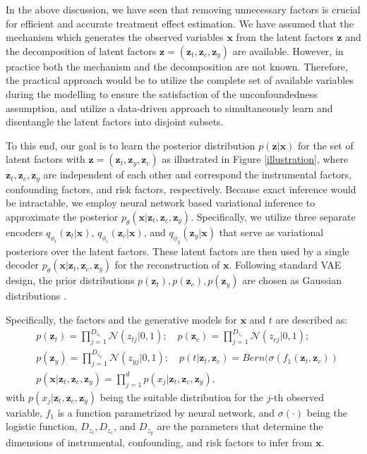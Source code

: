 \documentclass[letterpaper]{article} %
\begin{document}
In the above discussion, we have seen that removing unnecessary factors is crucial for efficient and accurate treatment effect estimation. We have assumed that the mechanism which generates the observed variables $\mathbf{x}$ from the latent factors $\mathbf{z}$ and the decomposition of latent factors $\mathbf{z} = (\mathbf{z}_t, \mathbf{z}_c, \mathbf{z}_y)$ are available.
However, in practice both the mechanism and the decomposition are not known. Therefore, the practical approach would be to utilize the complete set of available variables during the modelling to ensure the satisfaction of the unconfoundedness assumption, and utilize a data-driven approach to simultaneously learn and disentangle the latent factors into disjoint subsets.

To this end, our goal is to learn the posterior distribution $p(\mathbf{z}|\mathbf{x})$ for the set of latent factors  with $\mathbf{z}= (\mathbf{z}_t, \mathbf{z}_y, \mathbf{z}_c)$ as illustrated in Figure \ref{illustration}, where $\mathbf{z}_t,\mathbf{z}_c, \mathbf{z}_y$ are independent of each other and correspond the instrumental factors, confounding factors, and risk factors, respectively.
Because exact inference would be intractable, we employ neural network based variational inference to approximate the posterior $p_\theta(\mathbf{x}|\mathbf{z}_t, \mathbf{z}_c, \mathbf{z}_y)$. Specifically, we utilize three separate encoders $q_{\phi_t}(\mathbf{z}_t|\mathbf{x})$, $q_{\phi_c}(\mathbf{z}_c|\mathbf{x})$, and $q_{\phi_y}(\mathbf{z}_y|\mathbf{x})$ that serve as variational posteriors over the latent factors. 
These latent factors are then used by a single decoder $p_\theta(\mathbf{x}|\mathbf{z}_t,\mathbf{z}_c, \mathbf{z}_y)$ for the reconstruction of $\mathbf{x}$. Following standard VAE design, the prior distributions $p(\mathbf{z}_t),p(\mathbf{z}_c),p(\mathbf{z}_y)$ are chosen as Gaussian distributions \cite{Kingma2014}. 

Specifically, the factors and the generative models for $\mathbf{x}$ and $t$ are described as:
\begin{align}
&p(\mathbf{z}_t) = \prod\limits_{j=1}^{D_{z_t}} \mathcal{N}(z_{tj}|0,1);\quad
p(\mathbf{z}_c) = \prod\limits_{j=1}^{D_{z_c}} \mathcal{N}(z_{cj}|0,1); \nonumber\\
&p(\mathbf{z}_y) = \prod\limits_{j=1}^{D_{z_y}} \mathcal{N}(z_{yj}|0,1);\quad p(t|\mathbf{z}_t,\mathbf{z}_c) = Bern(\sigma(f_1(\mathbf{z}_t,\mathbf{z}_c))\nonumber\\
& p(\mathbf{x}|\mathbf{z}_t,\mathbf{z}_c, \mathbf{z}_y) = \prod\limits_{j=1}^{d} p(x_j|\mathbf{z}_t,\mathbf{z}_c, \mathbf{z}_y),
\end{align}
with $p(x_j|\mathbf{z}_t,\mathbf{z}_c, \mathbf{z}_y)$ being the suitable distribution for the $j$-th observed variable, $f_1$ is a function parametrized by neural network, and $\sigma(\cdot)$ being the logistic function, $D_{z_t},D_{z_c}$, and $D_{z_y}$ are the parameters that determine the dimensions of instrumental, confounding, and risk factors to infer from $\mathbf{x}$. 
\end{document}
